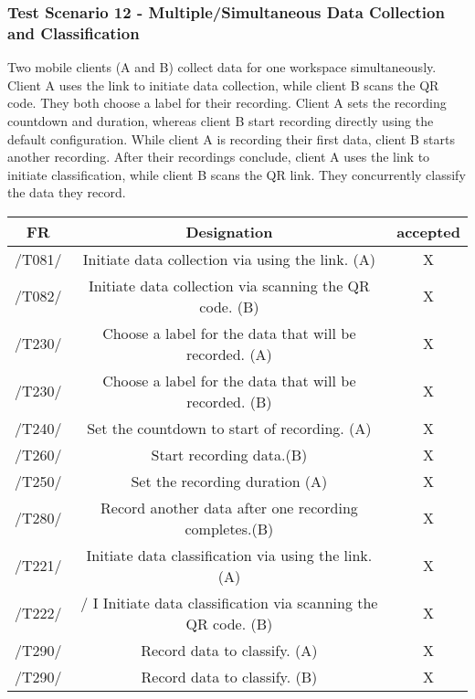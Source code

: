 \subsubsection{Test Scenario 12 - Multiple/Simultaneous Data Collection and
Classification}
Two mobile clients (A and B) collect data for one workspace simultaneously. Client A
uses the link to initiate data collection, while client B scans the QR code. They both
choose a label for their recording. Client A sets the recording countdown and duration,
whereas client B start recording directly using the default configuration. While client
A is recording their first data, client B starts another recording. After their recordings
conclude, client A uses the link to initiate classification, while client B scans the QR link.
They concurrently classify the data they record.
\begin{table}[h]
\begin{tabular}{!{\VRule}c!{\VRule}c!{\VRule}c!{\VRule}}
\hline
FR     & Designation                                                                    &accepted                \\
\hline
  /T081/  &  Initiate data collection via using the link. (A) &  X  \\
 \hline
  /T082/ &  Initiate data collection via scanning the QR code. (B)& X   \\
 \hline
 /T230/   &  Choose a label for the data that will be recorded. (A) & X  \\
 \hline
  /T230/   & Choose a label for the data that will be recorded. (B) &  X  \\
 \hline
  /T240/    &  Set the countdown to start of recording. (A) & X   \\
 \hline
 /T260/  &  Start recording data.(B) &  X  \\
 \hline
  /T250/  &  Set the recording duration (A) &  X  \\
 \hline
  /T280/   &  Record another data after one recording completes.(B) & X   \\
 \hline
 /T221/  &    Initiate data classification via using the link. (A)
 & X   \\
 \hline
 /T222/  &   / I Initiate data classification via scanning the QR code. (B)

 & X   \\
 \hline
 /T290/  &   Record data to classify. (A)&  X  \\
  \hline
  /T290/  &   Record data to classify. (B)& X   \\
  \hline
\end{tabular}
\end{table}